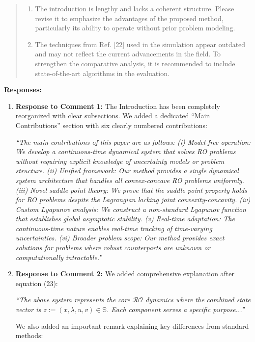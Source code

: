 \documentclass[journal,twoside,web]{ieeecolor}
\begin{document}
\begin{quote}
\begin{enumerate}
\item The introduction is lengthy and lacks a coherent structure. Please revise it to emphasize the advantages of the proposed method, particularly its ability to operate without prior problem modeling.

\item The techniques from Ref. [22] used in the simulation appear outdated and may not reflect the current advancements in the field. To strengthen the comparative analysis, it is recommended to include state-of-the-art algorithms in the evaluation.
\end{enumerate}
\end{quote}

\noindent\textbf{Responses:}

\begin{enumerate}
\item \textbf{Response to Comment 1:} The Introduction has been completely reorganized with clear subsections. We added a dedicated ``Main Contributions'' section with six clearly numbered contributions:

{\color{revisionblue}\textit{``The main contributions of this paper are as follows: (i) Model-free operation: We develop a continuous-time dynamical system that solves RO problems without requiring explicit knowledge of uncertainty models or problem structure. (ii) Unified framework: Our method provides a single dynamical system architecture that handles all convex-concave RO problems uniformly. (iii) Novel saddle point theory: We prove that the saddle point property holds for RO problems despite the Lagrangian lacking joint convexity-concavity. (iv) Custom Lyapunov analysis: We construct a non-standard Lyapunov function that establishes global asymptotic stability. (v) Real-time adaptation: The continuous-time nature enables real-time tracking of time-varying uncertainties. (vi) Broader problem scope: Our method provides exact solutions for problems where robust counterparts are unknown or computationally intractable.''}}

\item \textbf{Response to Comment 2:} We added comprehensive explanation after equation (23):

{\color{revisionblue}\textit{``The above system represents the core $\mathcal{RO}$ dynamics where the combined state vector is $z:=(x,\lambda,u,v) \in \mathbb{S}$. Each component serves a specific purpose...''}}

We also added an important remark explaining key differences from standard methods:


\end{enumerate}
\end{document}
